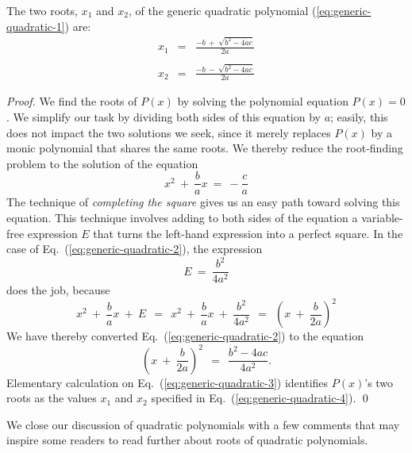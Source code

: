 \begin{prop}
\label{thm:quadratic-formula}
The two roots, $x_1$ and $x_2$, of the generic quadratic polynomial (\ref{eq:generic-quadratic-1}) are:
\begin{eqnarray}
\nonumber
x_1 & = & \frac{-b \ + \ \sqrt{b^2 -4ac}}{2a} \\
\label{eq:generic-quadratic-4}
    &   & \\
\nonumber
x_2 & = & \frac{-b \ - \ \sqrt{b^2 -4ac}}{2a}
\end{eqnarray}
\end{prop}


\begin{proof}
We find the roots of $P(x)$ by solving the polynomial equation $P(x) = 0$.  We simplify our task by dividing both sides of this equation by $a$; easily, this does not impact the two solutions we seek, since it merely replaces $P(x)$ by a monic polynomial that shares the same roots.  We thereby reduce the root-finding problem to the solution of the equation
\begin{equation}
\label{eq:generic-quadratic-2}
x^2 \ + \ \frac{b}{a} x \ = \ - \frac{c}{a}
\end{equation}
The technique of {\it completing the square} gives us an easy path toward solving this equation.  This technique involves adding to both sides of the equation a variable-free expression $E$ that turns the left-hand expression into a perfect square.  In the case of Eq.~(\ref{eq:generic-quadratic-2}), the expression
\[ E \ = \ \frac{b^2}{4a^2} \]
does the job, because
\[
x^2 \ + \ \frac{b}{a} x \ + \ E \ \ = \ \
x^2 \ + \ \frac{b}{a} x \ + \ \frac{b^2}{4a^2}
   \ \ = \ \ \left( x \ + \ \frac{b}{2a} \right)^2
\]
We have thereby converted Eq.~(\ref{eq:generic-quadratic-2}) to the equation
\begin{equation}
\label{eq:generic-quadratic-3}
\left( x \ + \ \frac{b}{2a} \right)^2
 \ \ = \ \ \frac{b^2 - 4ac}{4a^2}.
\end{equation}
Elementary calculation on Eq.~(\ref{eq:generic-quadratic-3}) identifies $P(x)$'s two roots as the values $x_1$ and $x_2$ specified in Eq.~(\ref{eq:generic-quadratic-4}).  \qed
\end{proof}

\bigskip

\noindent
We close our discussion of quadratic polynomials with a few comments that may inspire some readers to read further about roots of quadratic polynomials.

